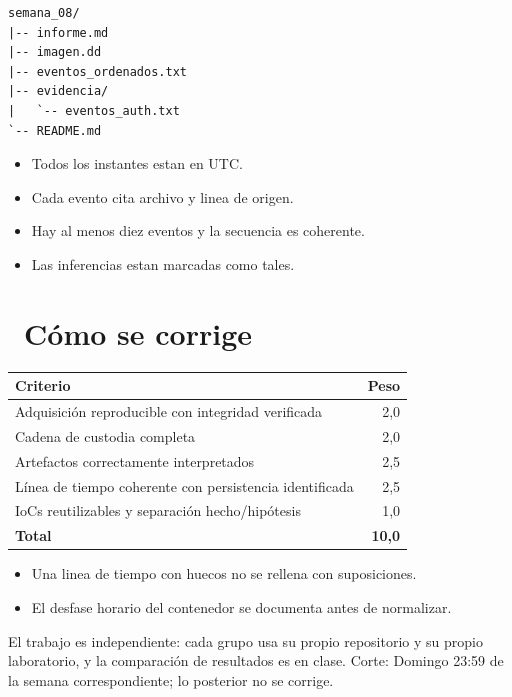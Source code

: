 \documentclass[11pt,a4paper]{article}
\newcommand{\iconotexto}[2]{\textcolor{cyanNeon}{\faIcon{#1}}~#2}
\begin{document}
\begin{lstlisting}[style=estiloCodigo]
semana_08/
|-- informe.md
|-- imagen.dd
|-- eventos_ordenados.txt
|-- evidencia/
|   `-- eventos_auth.txt
`-- README.md
\end{lstlisting}

\begin{itemize}[leftmargin=1.4em,itemsep=2pt,topsep=3pt]
  \item Todos los instantes estan en UTC.
  \item Cada evento cita archivo y linea de origen.
  \item Hay al menos diez eventos y la secuencia es coherente.
  \item Las inferencias estan marcadas como tales.
\end{itemize}

\section{\iconotexto{ruler-combined}{Cómo se corrige}}

\begin{tabularx}{\linewidth}{@{}X r@{}}
\toprule
Criterio & Peso\\
\midrule
Adquisición reproducible con integridad verificada & 2,0 \\
Cadena de custodia completa & 2,0 \\
Artefactos correctamente interpretados & 2,5 \\
Línea de tiempo coherente con persistencia identificada & 2,5 \\
IoCs reutilizables y separación hecho/hipótesis & 1,0 \\
\midrule
\textbf{Total} & \textbf{10,0}\\
\bottomrule
\end{tabularx}

\begin{itemize}[leftmargin=1.4em,itemsep=2pt,topsep=3pt]
  \item Una linea de tiempo con huecos no se rellena con suposiciones.
  \item El desfase horario del contenedor se documenta antes de normalizar.
\end{itemize}

\begin{cajaRecuerda}El trabajo es independiente: cada grupo usa su propio repositorio y su propio laboratorio, y la comparación de resultados es en clase. Corte: Domingo 23:59 de la semana correspondiente; lo posterior no se corrige.
\end{cajaRecuerda}
\end{document}
